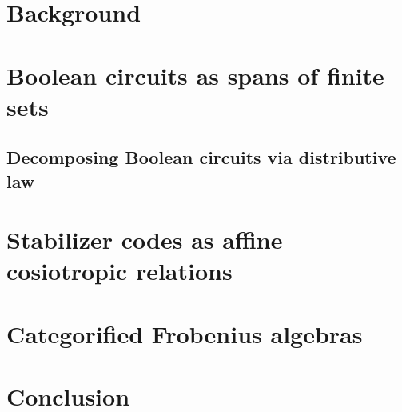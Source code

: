 \documentclass[12pt]{ociamthesis}  %
\begin{document}
\chapter{Background}
\label{chap:background}


\chapter{Boolean circuits as spans of finite sets}
\label{chap:zxa}


\section{Decomposing Boolean circuits via distributive law}


\chapter{Stabilizer codes as affine cosiotropic relations}
\label{chap:stab}


\chapter{Categorified Frobenius algebras}
\label{chap:grothendieck}
%

\chapter{Conclusion}
\label{chap:conclusion}

 

\end{document}
